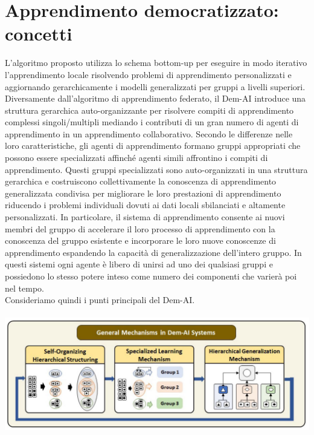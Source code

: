 \chapter{Apprendimento democratizzato: concetti}\label{ch:chapter2}
L'algoritmo proposto utilizza lo schema bottom-up per eseguire in modo iterativo l'apprendimento locale risolvendo problemi di apprendimento personalizzati e aggiornando gerarchicamente i modelli generalizzati per gruppi a livelli superiori.\\
Diversamente dall'algoritmo di apprendimento federato, il Dem-AI introduce una struttura gerarchica auto-organizzante per risolvere compiti di apprendimento complessi singoli/multipli mediando i contributi di un gran numero di agenti di apprendimento in un apprendimento collaborativo. Secondo le differenze nelle loro caratteristiche, gli agenti di apprendimento formano gruppi appropriati che possono essere specializzati affinché agenti simili affrontino i compiti di apprendimento. Questi gruppi specializzati sono auto-organizzati in una struttura gerarchica e costruiscono collettivamente la conoscenza di apprendimento generalizzata condivisa per migliorare le loro prestazioni di apprendimento riducendo i problemi individuali dovuti ai dati locali sbilanciati e altamente personalizzati. In particolare, il sistema di apprendimento consente ai nuovi membri del gruppo di accelerare il loro processo di apprendimento con la conoscenza del gruppo esistente e incorporare le loro nuove conoscenze di apprendimento espandendo la capacità di generalizzazione dell'intero gruppo. In questi sistemi ogni agente è libero di unirsi ad uno dei qualsiasi gruppi e possiedono lo stesso potere inteso come numero dei componenti che varierà poi nel tempo.\\
Consideriamo quindi i punti principali del Dem-AI.\\\\
\includegraphics[scale=0.25]{DemIA}

